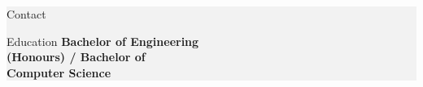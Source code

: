 \documentclass{custom-resume}
\begin{document}
\selectfont



\TitleRule
\vspace{-6pt} %

\hspace{-2cm} %
\colorbox{f2f2f2}{
\begin{minipage}[t][23cm]{0.39\textwidth}


  \hspace{1.6cm}  %
  \begin{minipage}[t][23cm]{0.64\textwidth}

    \raggedright

    \vspace{6pt} %


    \begin{section}{Contact}
    \end{section}


    \begin{section}{Education}
      {
        \small
        \textbf{Bachelor of Engineering\\ (Honours) / Bachelor of\\ Computer Science}
      } \\[8pt]


\end{section}
\end{minipage}
\end{minipage}}
\end{document}
